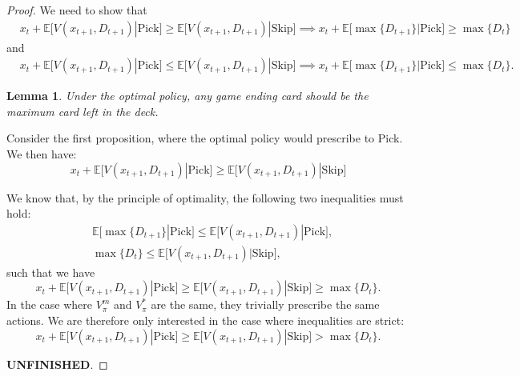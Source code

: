 \documentclass{article}
\newtheorem{lemma}[theorem]{Lemma}
\begin{document}
\begin{proof}
    We need to show that
    \begin{align}
         & x_t + \mathbb{E}\Big[V(x_{t+1}, D_{t+1})  |   \text{Pick}   \Big] \geq \mathbb{E}\Big[V(x_{t+1}, D_{t+1})  |   \text{Skip}   \Big] \implies x_t+  \mathbb{E}\big[\max\{D_{t+1}\} | \text{Pick} \big] \geq \max\{D_t\}
    \end{align}
    and
    \begin{align}
         & x_t + \mathbb{E}\Big[V(x_{t+1}, D_{t+1})  |   \text{Pick}   \Big] \leq \mathbb{E}\Big[V(x_{t+1}, D_{t+1})  |   \text{Skip}   \Big] \implies x_t+  \mathbb{E}\big[\max\{D_{t+1}\} | \text{Pick} \big]    \leq \max\{D_t\}   .
    \end{align}


    \begin{lemma}
        Under the optimal policy, any game ending card should be the maximum card left in the deck.
    \end{lemma}
    Consider the first proposition, where the optimal policy would prescribe to Pick. We then have:
    \begin{equation}
        x_t + \mathbb{E}\Big[V(x_{t+1}, D_{t+1})  |   \text{Pick}   \Big] \geq \mathbb{E}\Big[V(x_{t+1}, D_{t+1})  |   \text{Skip}   \Big]    \end{equation}

    We know that, by the principle of optimality, the following two inequalities must hold:
    \begin{align}
         & \mathbb{E}\big[\max\{D_{t+1}\} | \text{Pick} \big] \leq \mathbb{E}\Big[V(x_{t+1}, D_{t+1})  |   \text{Pick}   \Big], \\
         & \max\{D_t\}  \leq \mathbb{E}\Big[V(x_{t+1}, D_{t+1})  |   \text{Skip}   \Big],
    \end{align}
    such that we have
    \begin{equation}
        x_t + \mathbb{E}\Big[V(x_{t+1}, D_{t+1})  |   \text{Pick}   \Big] \geq \mathbb{E}\Big[V(x_{t+1}, D_{t+1})  |   \text{Skip}   \Big] \geq \max\{D_t\} .
    \end{equation}
    In the case where $V_\pi^m$ and $V_\pi^*$ are the same, they trivially prescribe the same actions. We are therefore only interested in the case where inequalities are strict:
    \begin{equation}
        x_t + \mathbb{E}\Big[V(x_{t+1}, D_{t+1})  |   \text{Pick}   \Big] \geq \mathbb{E}\Big[V(x_{t+1}, D_{t+1})  |   \text{Skip}   \Big] > \max\{D_t\} .
    \end{equation}

    \textbf{UNFINISHED}.

\end{proof}
\end{document}
